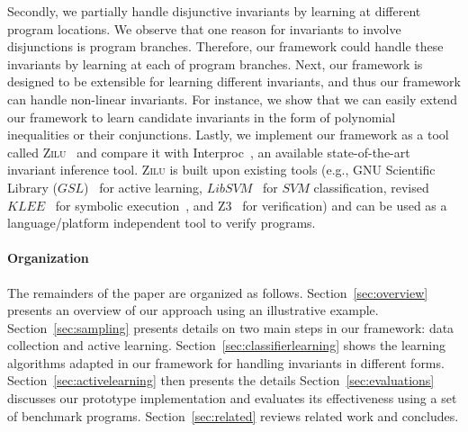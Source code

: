 Secondly, we partially handle disjunctive invariants by learning at different program locations.
We observe that one reason for invariants to involve disjunctions is program branches.
Therefore, our framework could handle these invariants by learning at each of program branches.
Next, our framework is designed to be extensible for learning different invariants, 
and thus our framework can handle non-linear invariants.
For instance, we show that we can easily extend our framework to learn candidate invariants in the form of polynomial inequalities or their conjunctions.
Lastly, we implement our framework as a tool called \textsc{Zilu}~\cite{zilu:repo} and compare it with Interproc~\cite{jeannet2010interproc}, %
an available state-of-the-art invariant inference tool.
    \textsc{Zilu} is built upon existing tools (e.g., GNU Scientific Library ($\mathit{GSL}$)~\cite{gough2009gnu} for active learning,
    $\mathit{LibSVM}$~\cite{chang2011libsvm} for $\mathit{SVM}$ classification,
    revised $\mathit{KLEE}$~\cite{cadar2008klee} for symbolic execution~\cite{king1976symbolic,symbolic}, and Z3~\cite{de2008z3} for verification) and 
    can be used as a language/platform independent tool to verify programs.

\paragraph{Organization} The remainders of the paper are organized as follows. 
Section~\ref{sec:overview} presents an overview of our approach using an illustrative example. 
Section~\ref{sec:sampling} presents details on two main steps in our framework: data collection and active learning. 
Section~\ref{sec:classifierlearning} shows the learning algorithms adapted in our framework for handling invariants in different forms.
Section~\ref{sec:activelearning} then presents the details 
Section~\ref{sec:evaluations} discusses our prototype implementation and evaluates its effectiveness using a set of benchmark programs. 
Section~\ref{sec:related} reviews related work and concludes.

